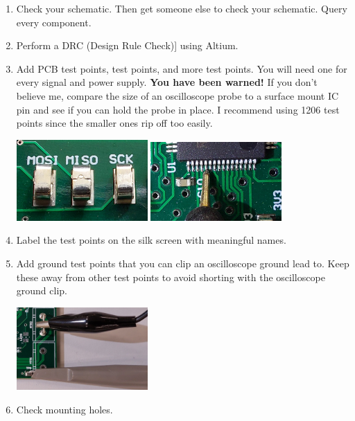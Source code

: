 \begin{enumerate}
\item Check your schematic.  Then get someone else to check your
  schematic.  Query every component.

\item Perform a DRC (Design Rule Check)] using Altium.

\item Add PCB test points, test points, and more test points.  You
  will need one for every signal and power supply.  \textbf{You have
    been warned!}  If you don't believe me, compare the size of an
  oscilloscope probe to a surface mount IC pin and see if you can hold
  the probe in place.  I recommend using 1206 test points since the
  smaller ones rip off too easily.

  \includegraphics[width=5cm]{../guide/figs/testpoints.jpg}  \includegraphics[width=5cm]{../guide/figs/micro_probe_zoom.jpg}

\item Label the test points on the silk screen with meaningful names.

\item Add ground test points that you can clip an oscilloscope ground
  lead to.  Keep these away from other test points to avoid shorting
  with the oscilloscope ground clip.

\includegraphics[width=5cm]{figs/scope_probe_testpoints.jpg}

\item Check mounting holes.


\end{enumerate}
